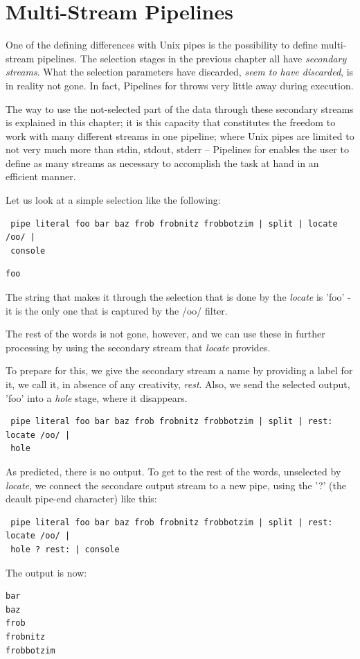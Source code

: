 \chapter{Multi-Stream Pipelines}
One of the defining differences with Unix pipes is the possibility to
define multi-stream pipelines. The selection stages in the previous
chapter all have \emph{secondary streams}. What the selection
parameters have discarded, \emph{seem to have discarded}, is in
reality not gone. In fact, Pipelines for \nr{} throws very little away during
execution.

The way to use the not-selected part of the data through
these secondary streams is explained in this chapter; it is this
capacity that constitutes the freedom to work with many different
streams in one pipeline; where Unix pipes are limited to not very much
more than stdin, stdout, stderr -- Pipelines for \nr{} enables the user
to define as many streams as necessary to accomplish the task at hand
in an efficient manner.

Let us look at a simple selection like the following:

\begin{lstlisting}
 pipe literal foo bar baz frob frobnitz frobbotzim | split | locate /oo/ |
 console
\end{lstlisting}
\begin{verbatim}
foo
\end{verbatim}
The string that makes it through the selection that is done by the
\emph{locate} is 'foo' - it is the only one that is captured by the
/oo/ filter.

The rest of the words is not gone, however, and we can use these in
further processing by using the secondary stream that \emph{locate}
provides.

To prepare for this, we give the secondary stream a name by providing
a label for it, we call it, in absence of any creativity,
\emph{rest}. Also, we send the selected output, 'foo' into a
\emph{hole} stage, where it disappears.
\begin{lstlisting}
 pipe literal foo bar baz frob frobnitz frobbotzim | split | rest: locate /oo/ |
 hole
\end{lstlisting}
As predicted, there is no output. To get to the rest of the words,
unselected by \emph{locate}, we connect the secondare output stream to
a new pipe, using the '?' (the deault pipe-end character) like this:
\begin{lstlisting}
 pipe literal foo bar baz frob frobnitz frobbotzim | split | rest: locate /oo/ |
 hole ? rest: | console
\end{lstlisting}
The output is now:
\begin{verbatim}
bar
baz
frob
frobnitz
frobbotzim
\end{verbatim}

